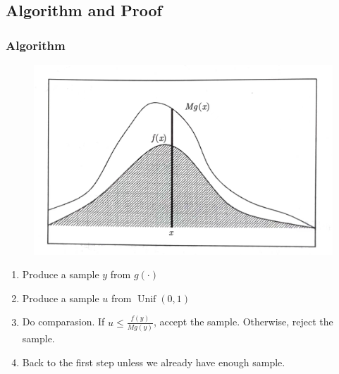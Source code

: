 \subsection{Algorithm and Proof}
\begin{frame}
    \frametitle{Algorithm}
    \vspace{-\baselineskip}
    \begin{figure}
        \begin{center}
            \includegraphics[width = .58\linewidth]{image1.png}
        \end{center}
    \end{figure}
    \vspace{-\baselineskip}
    \begin{enumerate}
        \item Produce a sample \(y\) from \(g(\cdot)\)
        \item Produce a sample \(u\) from \(\operatorname{Unif}(0,1)\)
        \item Do comparasion. If \(u \leq \frac{f(y)}{Mg(y)}\), accept the sample. Otherwise, reject the sample.
        \item Back to the first step unless we already have enough sample.
    \end{enumerate}

    

\end{frame}

